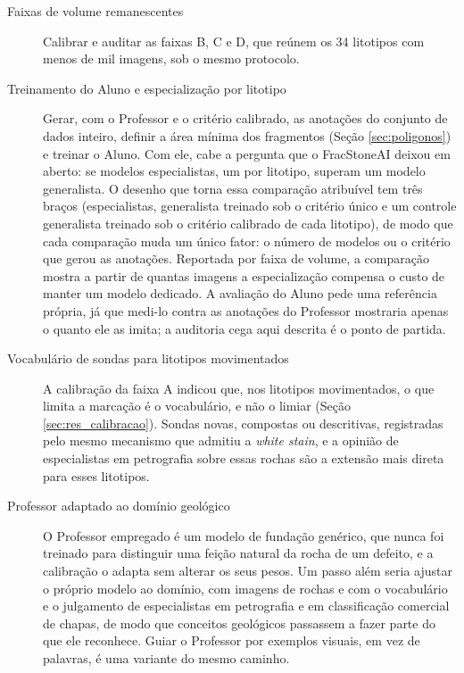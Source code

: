 \begin{description}

  \item[Faixas de volume remanescentes] Calibrar e auditar as faixas B, C e D, que reúnem os 34 litotipos com menos de mil imagens, sob o mesmo protocolo.

  \item[Treinamento do Aluno e especialização por litotipo] Gerar, com o Professor e o critério calibrado, as anotações do conjunto de dados inteiro, definir a área mínima dos fragmentos (Seção \ref{sec:poligonos}) e treinar o Aluno. Com ele, cabe a pergunta que o FracStoneAI deixou em aberto: se modelos especialistas, um por litotipo, superam um modelo generalista. O desenho que torna essa comparação atribuível tem três braços (especialistas, generalista treinado sob o critério único e um controle generalista treinado sob o critério calibrado de cada litotipo), de modo que cada comparação muda um único fator: o número de modelos ou o critério que gerou as anotações. Reportada por faixa de volume, a comparação mostra a partir de quantas imagens a especialização compensa o custo de manter um modelo dedicado. A avaliação do Aluno pede uma referência própria, já que medi-lo contra as anotações do Professor mostraria apenas o quanto ele as imita; a auditoria cega aqui descrita é o ponto de partida.

  \item[Vocabulário de sondas para litotipos movimentados] A calibração da faixa A indicou que, nos litotipos movimentados, o que limita a marcação é o vocabulário, e não o limiar (Seção \ref{sec:res_calibracao}). Sondas novas, compostas ou descritivas, registradas pelo mesmo mecanismo que admitiu a \textit{white stain}, e a opinião de especialistas em petrografia sobre essas rochas são a extensão mais direta para esses litotipos.

  \item[Professor adaptado ao domínio geológico] O Professor empregado é um modelo de fundação genérico, que nunca foi treinado para distinguir uma feição natural da rocha de um defeito, e a calibração o adapta sem alterar os seus pesos. Um passo além seria ajustar o próprio modelo ao domínio, com imagens de rochas e com o vocabulário e o julgamento de especialistas em petrografia e em classificação comercial de chapas, de modo que conceitos geológicos passassem a fazer parte do que ele reconhece. Guiar o Professor por exemplos visuais, em vez de palavras, é uma variante do mesmo caminho.


\end{description}
